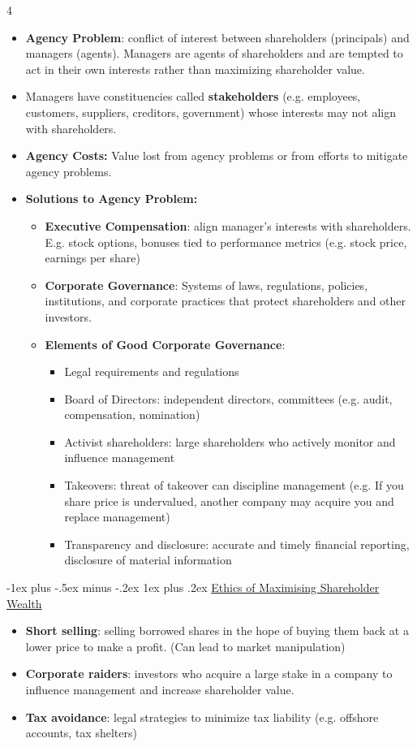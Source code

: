\documentclass[10pt, landscape]{article}
\makeatletter
\renewcommand{\subsubsection}{\@startsection{subsubsection}{3}{0mm}%
  {-1ex plus -.5ex minus -.2ex}%
  {1ex plus .2ex}%
{\normalfont\small\bfseries}}%
\makeatother
\begin{document}
\begin{multicols*}{4}
\begin{itemize}
    \item \textbf{Agency Problem}: conflict of interest between shareholders (principals) and managers (agents). Managers are agents of shareholders and are tempted to act in their own interests rather than maximizing shareholder value.
    \item Managers have constituencies called \textbf{stakeholders} (e.g. employees, customers, suppliers, creditors, government) whose interests may not align with shareholders.
    \item \textbf{Agency Costs:} Value lost from agency problems or from efforts to mitigate agency problems.
    \item \textbf{Solutions to Agency Problem:}
      \begin{itemize}
        \item \textbf{Executive Compensation}: align manager's interests with shareholders. E.g. stock options, bonuses tied to performance metrics (e.g. stock price, earnings per share)
        \item \textbf{Corporate Governance}: Systems of laws, regulations, policies, institutions, and corporate practices that protect shareholders and other investors.
        \item \textbf{Elements of Good Corporate Governance}:
          \begin{itemize}
            \item Legal requirements and regulations
            \item Board of Directors: independent directors, committees (e.g. audit, compensation, nomination)
            \item Activist shareholders: large shareholders who actively monitor and influence management
            \item Takeovers: threat of takeover can discipline management (e.g. If you share price is undervalued, another company may acquire you and replace management)
            \item Transparency and disclosure: accurate and timely financial reporting, disclosure of material information
          \end{itemize}
      \end{itemize}
  \end{itemize}

  \subsubsection{\underline{Ethics of Maximising Shareholder Wealth}}
  \begin{itemize}
    \item \textbf{Short selling}: selling borrowed shares in the hope of buying them back at a lower price to make a profit. (Can lead to market manipulation)
    \item \textbf{Corporate raiders}: investors who acquire a large stake in a company to influence management and increase shareholder value.
    \item \textbf{Tax avoidance}: legal strategies to minimize tax liability (e.g. offshore accounts, tax shelters)
  \end{itemize}


\end{multicols*}
\end{document}
